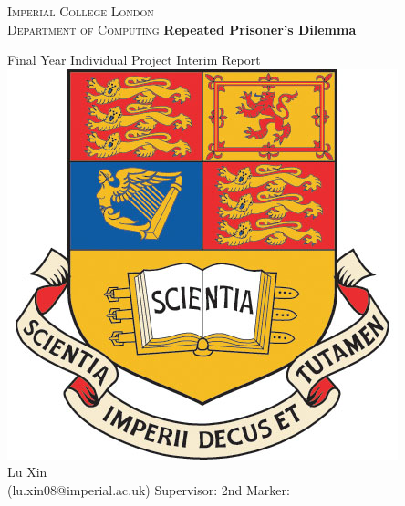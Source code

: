 
\begin{titlepage}
\begin{center}
\textsc{\Large Imperial College London\\Department of Computing}
\vfil
{\Huge{\textbf{Repeated Prisoner's Dilemma}}}\linebreak \linebreak

\vfil
{\LARGE Final Year Individual Project}\linebreak \linebreak
{\LARGE Interim Report}\\[1.5cm]
{\includegraphics[scale=.35]{ImperialCrest.jpg}}\\[1.5cm]
{\Large Lu Xin}\\
(lu.xin08@imperial.ac.uk)
\vfil
{\Large Supervisor: \supervisor} \linebreak \linebreak
{\Large 2nd Marker: \secondmarker}
\vfil
{\Large \monthname\ \number\year}
\end{center}
\end{titlepage}
